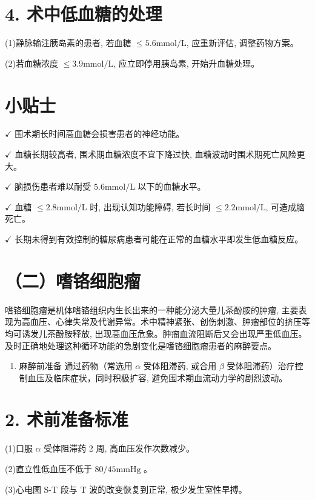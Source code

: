 \documentclass[10pt]{article}
\begin{document}
\section*{4. 术中低血糖的处理}
(1)静脉输注胰岛素的患者, 若血糖 $\leqslant 5.6 \mathrm{mmol} / \mathrm{L}$, 应重新评估, 调整药物方案。

(2)若血糖浓度 $\leqslant 3.9 \mathrm{mmol} / \mathrm{L}$, 应立即停用胰岛素, 开始升血糖处理。

\section*{小贴士}
$\checkmark$ 围术期长时间高血糖会损害患者的神经功能。

$\checkmark$ 血糖长期较高者, 围术期血糖浓度不宜下降过快, 血糖波动时围术期死亡风险更大。

$\checkmark$ 脑损伤患者难以耐受 $5.6 \mathrm{mmol} / \mathrm{L}$ 以下的血糖水平。

$\checkmark$ 血糖 $\leqslant 2.8 \mathrm{mmol} / \mathrm{L}$ 时, 出现认知功能障碍, 若长时间 $\leqslant 2.2 \mathrm{mmol} / \mathrm{L}$, 可造成脑死亡。

$\checkmark$ 长期未得到有效控制的糖尿病患者可能在正常的血糖水平即发生低血糖反应。

\section*{（二）嗜铬细胞瘤}
嗜铬细胞瘤是机体嗜铬组织内生长出来的一种能分泌大量儿茶酚胺的肿瘤, 主要表现为高血压、心律失常及代谢异常。术中精神紧张、创伤刺激、肿瘤部位的挤压等均可诱发儿茶酚胺释放, 出现高血压危象。肿瘤血流阻断后又会出现严重低血压。及时正确地处理这种循环功能的急剧变化是嗜铬细胞瘤患者的麻醉要点。

\begin{enumerate}
  \item 麻醉前准备 通过药物（常选用 $\alpha$ 受体阻滞药, 或合用 $\beta$ 受体阻滞药）治疗控制血压及临床症状，同时积极扩容, 避免围术期血流动力学的剧烈波动。
\end{enumerate}

\section*{2. 术前准备标准}
(1)口服 $\alpha$ 受体阻滞药 2 周, 高血压发作次数减少。

(2)直立性低血压不低于 $80 / 45 \mathrm{mmHg}$ 。

(3)心电图 S-T 段与 $\mathrm{T}$ 波的改变恢复到正常, 极少发生室性早搏。
\end{document}
